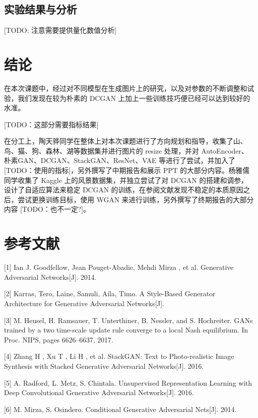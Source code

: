 \documentclass{article}
\begin{document}
\begin{CJK*}{UTF8}{gbsn}
  \subsection{实验结果与分析}

  [TODO: 注意需要提供量化数值分析]

\section{结论}

在本次课题中，经过对不同模型在生成图片上的研究，以及对参数的不断调整和试验，我们发现在较为朴素的 DCGAN 上加上一些训练技巧便已经可以达到较好的水准。

[TODO：这部分需要指标结果]

在分工上，陶天骅同学在整体上对本次课题进行了方向规划和指导，收集了山、鸟、猫、狗、森林、湖等数据集并进行图片的 resize 处理，并对 AutoEncoder、朴素GAN、DCGAN、StackGAN、ResNet、VAE 等进行了尝试，并加入了 [TODO：使用的指标]，另外撰写了中期报告和展示 PPT 的大部分内容。杨雅儒同学收集了 Kaggle 上的风景数据集，并独立尝试了对 DCGAN 的搭建和调参，设计了自适应算法来稳定 DCGAN 的训练，在参阅文献发现不稳定的本质原因之后，尝试更换训练目标，使用 WGAN 来进行训练，另外撰写了终期报告的大部分内容 [TODO：也不一定?]。

\section*{参考文献}

\small

[1] Ian J. Goodfellow, Jean Pouget-Abadie, Mehdi Mirza , et al. Generative Adversarial Networks[J]. 2014.

[2] Karras, Tero, Laine, Samuli, Aila, Timo. A Style-Based Generator Architecture for Generative Adversarial Networks[J].

[3] M. Heusel, H. Ramsauer, T. Unterthiner, B. Nessler, and S. Hochreiter. GANs trained by a two time-scale update rule converge to a local Nash equilibrium. In Proc. NIPS, pages 6626–6637, 2017.

[4] Zhang H , Xu T , Li H , et al. StackGAN: Text to Photo-realistic Image Synthesis with Stacked Generative Adversarial Networks[J]. 2016.

[5] A. Radford, L. Metz, S. Chintala. Unsupervised Representation Learning with Deep Convolutional Generative Adversarial Networks[J]. 2016.

[6] M. Mirza, S. Osindero. Conditional Generative Adversarial Nets[J]. 2014.


\end{CJK*}
\end{document}
